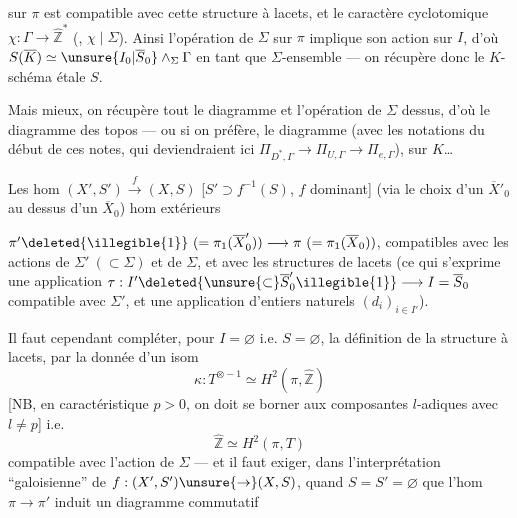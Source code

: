 
   sur $\pi$ est
compatible avec cette structure à lacets,
et le caractère cyclotomique $\chi:\Gamma\to\widehat{\mathbb Z}^{*}$
(, $\chi\mid\Sigma$). Ainsi l'opération de
$\Sigma$ sur $\pi$ implique son action sur $I$, d'où
$S(\overline K)\simeq\unsure{I_0|\overline S_0}\wedge_{\Sigma}\Gamma$ en tant que $\Sigma$-ensemble
--- on récupère donc le $K$-schéma étale $S$.

Mais mieux, on récupère tout le
diagramme
et l'opération de $\Sigma$ dessus, d'où le
diagramme des topos  --- ou si
on préfère, le diagramme
(avec les notations du début de ces notes,
qui deviendraient ici $\Pi_{D^{*},\Gamma}\to\Pi_{U,\Gamma}\to\Pi_{e,\Gamma}$),
  sur $K$\dots

Les hom $(X',S')\xrightarrow{f}(X,S)$
[$S'\supset f^{-1}(S)$, $f$ dominant]  
  (via le choix d'un $\overline X'_0$
au dessus d'un $\overline X_0$)   hom extérieurs



$\pi'\deleted{\illegible{1}}\ (=\pi_1(\overline X'_0))\longrightarrow\pi\ (=\pi_1(\overline X_0))$, compatibles
avec les actions de $\Sigma'\ (\subset\Sigma)$ et de $\Sigma$,
et avec les structures de lacets 
(ce qui s'exprime   une application
$\tau:I'\deleted{\unsure{\subset}\overline S'_0\illegible{1}}\longrightarrow I=\overline S_0$ compatible avec
$\Sigma'$, et une application d'entiers naturels
$(d_i)_{i\in I'}$).

Il faut cependant compléter,  pour
$I=\varnothing$ i.e. $S=\varnothing$, la définition de la
structure à lacets, par la donnée d'un
isom
\[
\kappa:T^{\otimes-1}\simeq H^2(\pi,\widehat{\mathbb Z})
\]
[NB, en caractéristique $p>0$, on doit se borner
aux composantes $l$-adiques avec $l\ne p$]
i.e.
\[
\widehat{\mathbb Z}\simeq H^2(\pi,T)
\]
compatible avec l'action de $\Sigma$
--- et il faut exiger, dans l'interprétation
``galoisienne'' de $f:(X',S')\unsure{\to}(X,S)$, quand $S=S'=\varnothing$
que l'hom $\pi\to\pi'$ induit un
diagramme commutatif

